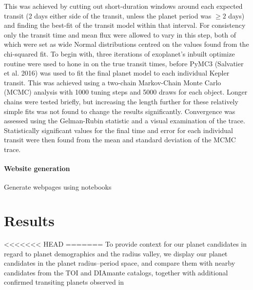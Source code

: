 \documentclass[floatfix,ApJL,twocolumn]{aastex631}
\begin{document}
This was achieved
by cutting out short-duration windows around each expected transit
(2 days either side of the transit, unless the planet period was $\geq2$
days) and finding the best-fit of the transit model within that interval.
For consistency only the transit time and mean flux were allowed to
vary in this step, both of which were set as wide Normal distributions
centred on the values found from the chi-squared fit. To begin with,
three iterations of exoplanet’s inbuilt optimize routine were used
to hone in on the true transit times, before PyMC3 (Salvatier et al.
2016) was used to fit the final planet model to each individual Kepler
transit. This was achieved using a two-chain Markov-Chain Monte
Carlo (MCMC) analysis with 1000 tuning steps and 5000 draws
for each object. Longer chains were tested briefly, but increasing
the length further for these relatively simple fits was not found to
change the results significantly. Convergence was assessed using
the Gelman-Rubin statistic and a visual examination of the trace.
Statistically significant values for the final time and error for each
individual transit were then found from the mean and standard
deviation of the MCMC trace.

%
%
%
%



\paragraph{Website generation}
Generate webpages using notebooks



\section{Results}\label{sec:results}

<<<<<<< HEAD
=======
To provide context for our planet candidates in regard to
planet demographics and the radius valley, we display our
planet candidates in the planet radius–period space, and compare them with nearby candidates from the TOI and DIAmante catalogs, together with additional confirmed transiting planets observed in
\end{document}

